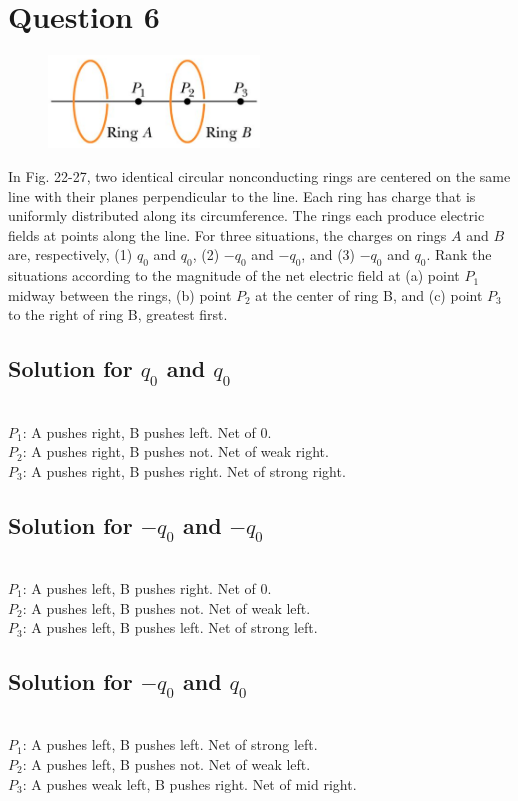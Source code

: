 \documentclass[12pt]{article}
\begin{document}
\section{Question 6}
\begin{figure}
    \vspace{-30pt}
    \includegraphics[width=0.5\textwidth]{picture_2.png} 
\end{figure}
In Fig. 22-27, two identical circular nonconducting rings are centered on the same line with their planes perpendicular to the line. Each ring has charge that is uniformly distributed along its circumference. The rings each produce electric fields at points along the line. For three situations, the charges on rings $A$ and $B$ are, respectively, (1) $q_0$ and $q_0$, (2) $-q_0$ and $-q_0$, and (3) $-q_0$ and $q_0$. Rank the situations according to the magnitude of the net electric field at (a) point $P_1$ midway between the rings, (b) point $P_2$ at the center of ring B, and (c) point $P_3$ to the right of ring B, greatest first.

\subsection{Solution for $q_0$ and $q_0$}
\\
$P_1$: A pushes right, B pushes left. Net of 0.\\
$P_2$: A pushes right, B pushes not. Net of weak right.\\
$P_3$: A pushes right, B pushes right. Net of strong right.

\subsection{Solution for $-q_0$ and $-q_0$}
\\
$P_1$: A pushes left, B pushes right. Net of 0.\\
$P_2$: A pushes left, B pushes not. Net of weak left.\\
$P_3$: A pushes left, B pushes left. Net of strong left.

\subsection{Solution for $-q_0$ and $q_0$}
\\
$P_1$: A pushes left, B pushes left. Net of strong left.\\
$P_2$: A pushes left, B pushes not. Net of weak left.\\
$P_3$: A pushes weak left, B pushes right. Net of mid right.
\end{document}

